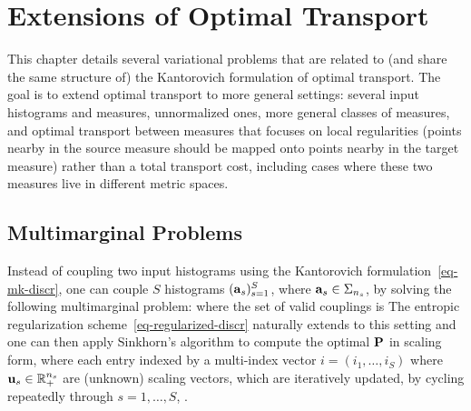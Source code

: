 
\chapter{Extensions of Optimal Transport}
\label{c-extensions}

This chapter details several variational problems that are related to (and share the same structure of) the Kantorovich formulation of optimal transport. The goal is to extend optimal transport to more general settings: several input histograms and measures, unnormalized ones, more general classes of measures, and optimal transport between measures that focuses on local regularities (points nearby in the source measure should be mapped onto points nearby in the target measure) rather than a total transport cost, including cases where these two measures live in different metric spaces.

\section{Multimarginal Problems}
\label{sec-multimarginal}

Instead of coupling two input histograms using the Kantorovich formulation~\eqref{eq-mk-discr}, one can couple $S$ histograms $(\a_s)_{s=1}^S$, where $\a_s \in \simplex_{n_s}$, by solving the following multimarginal problem:
where the set of valid couplings is
The entropic regularization scheme~\eqref{eq-regularized-discr} naturally extends to this setting
and one can then apply Sinkhorn's algorithm to compute the optimal $\P$ in scaling form, where each entry indexed by a multi-index vector $i=(i_1,\ldots,i_S)$
where $\uD_s \in \RR_+^{n_s}$ are (unknown) scaling vectors, which are iteratively updated, by cycling repeatedly through $s=1,\ldots,S$, 
.

